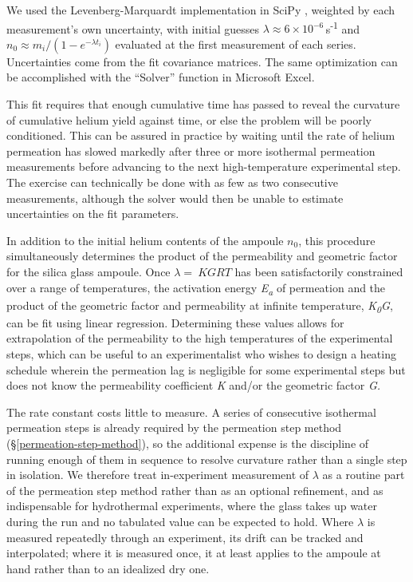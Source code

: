 We used the Levenberg-Marquardt implementation in SciPy \citep{virtanen2020}, weighted by each measurement's own uncertainty, with initial guesses \(\lambda \approx 6\times10^{-6}\)\,s\textsuperscript{-1} and \(n_{0} \approx m_{i}/\left( 1 - e^{- \lambda t_{i}} \right)\) evaluated at the first measurement of each series. Uncertainties come from the fit covariance matrices. The same optimization can be accomplished with the ``Solver'' function in Microsoft Excel.

This fit requires that enough cumulative time has passed to reveal the curvature of cumulative helium yield against time, or else the problem will be poorly conditioned. This can be assured in practice by waiting until the rate of helium permeation has slowed markedly after three or more isothermal permeation measurements before advancing to the next high-temperature experimental step. The exercise can technically be done with as few as two consecutive measurements, although the solver would then be unable to estimate uncertainties on the fit parameters.

In addition to the initial helium contents of the ampoule \(n_{0}\), this procedure simultaneously determines the product of the permeability and geometric factor for the silica glass ampoule. Once \(\lambda = \ KGRT\) has been satisfactorily constrained over a range of temperatures, the activation energy \emph{E\textsubscript{a}} of permeation and the product of the geometric factor and permeability at infinite temperature, \emph{K\textsubscript{0}G}, can be fit using linear regression. Determining these values allows for extrapolation of the permeability to the high temperatures of the experimental steps, which can be useful to an experimentalist who wishes to design a heating schedule wherein the permeation lag is negligible for some experimental steps but does not know the permeability coefficient \emph{K} and/or the geometric factor \emph{G.}

The rate constant costs little to measure. A series of consecutive isothermal permeation steps is already required by the permeation step method (\S\ref{permeation-step-method}), so the additional expense is the discipline of running enough of them in sequence to resolve curvature rather than a single step in isolation. We therefore treat in-experiment measurement of \(\lambda\) as a routine part of the permeation step method rather than as an optional refinement, and as indispensable for hydrothermal experiments, where the glass takes up water during the run and no tabulated value can be expected to hold. Where \(\lambda\) is measured repeatedly through an experiment, its drift can be tracked and interpolated; where it is measured once, it at least applies to the ampoule at hand rather than to an idealized dry one.

